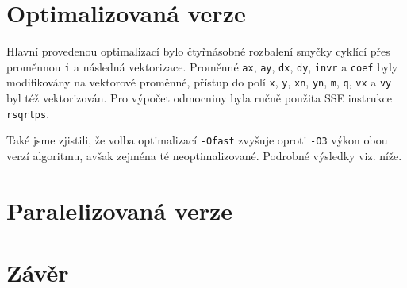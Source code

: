 \documentclass[10pt,a4paper]{article}
\begin{document}
\section{Optimalizovaná verze}

Hlavní provedenou optimalizací bylo čtyřnásobné rozbalení smyčky cyklící přes
proměnnou \texttt{i} a následná vektorizace. Proměnné \texttt{ax}, \texttt{ay},
\texttt{dx}, \texttt{dy}, \texttt{invr} a \texttt{coef} byly modifikovány na
vektorové proměnné, přístup do polí \texttt{x}, \texttt{y}, \texttt{xn},
\texttt{yn}, \texttt{m}, \texttt{q}, \texttt{vx} a \texttt{vy} byl též
vektorizován. Pro výpočet odmocniny byla ručně použita SSE instrukce
\texttt{rsqrtps}.

Také jsme zjistili, že volba optimalizací \texttt{-Ofast} zvyšuje oproti
\texttt{-O3} výkon obou verzí algoritmu, avšak zejména té neoptimalizované.
Podrobné výsledky viz. níže.

\section{Paralelizovaná verze}

\section{Závěr}
\end{document}
